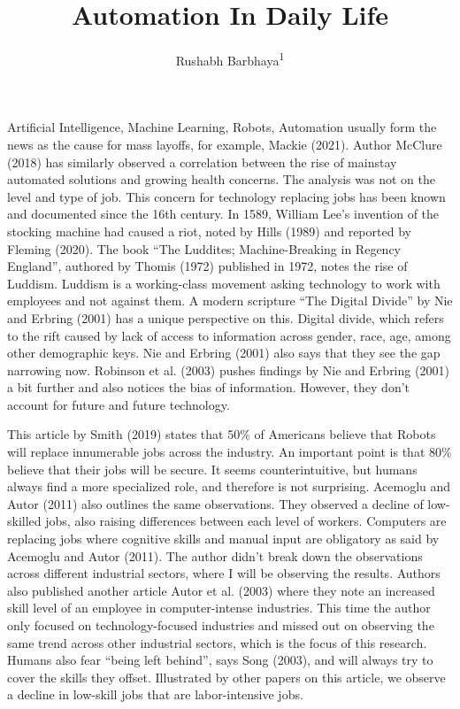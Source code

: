 \documentclass[
  man]{apa7}
\title{Automation In Daily Life}
\author{Rushabh Barbhaya\textsuperscript{1}}
\date{}
\affiliation{\vspace{0.5cm}\textsuperscript{1} Harrisburg University of Science and Technology}
\begin{document}
\maketitle

Artificial Intelligence, Machine Learning, Robots, Automation usually form the news as the cause for mass layoffs, for example, Mackie (2021). Author McClure (2018) has similarly observed a correlation between the rise of mainstay automated solutions and growing health concerns. The analysis was not on the level and type of job. This concern for technology replacing jobs has been known and documented since the 16th century. In 1589, William Lee's invention of the stocking machine had caused a riot, noted by Hills (1989) and reported by Fleming (2020). The book ``The Luddites; Machine-Breaking in Regency England'', authored by Thomis (1972) published in 1972, notes the rise of Luddism. Luddism is a working-class movement asking technology to work with employees and not against them. A modern scripture ``The Digital Divide'' by Nie and Erbring (2001) has a unique perspective on this. Digital divide, which refers to the rift caused by lack of access to information across gender, race, age, among other demographic keys. Nie and Erbring (2001) also says that they see the gap narrowing now. Robinson et al. (2003) pushes findings by Nie and Erbring (2001) a bit further and also notices the bias of information. However, they don't account for future and future technology.

This article by Smith (2019) states that 50\% of Americans believe that Robots will replace innumerable jobs across the industry. An important point is that 80\% believe that their jobs will be secure. It seems counterintuitive, but humans always find a more specialized role, and therefore is not surprising. Acemoglu and Autor (2011) also outlines the same observations. They observed a decline of low-skilled jobs, also raising differences between each level of workers. Computers are replacing jobs where cognitive skills and manual input are obligatory as said by Acemoglu and Autor (2011). The author didn't break down the observations across different industrial sectors, where I will be observing the results. Authors also published another article Autor et al. (2003) where they note an increased skill level of an employee in computer-intense industries. This time the author only focused on technology-focused industries and missed out on observing the same trend across other industrial sectors, which is the focus of this research. Humans also fear ``being left behind'', says Song (2003), and will always try to cover the skills they offset. Illustrated by other papers on this article, we observe a decline in low-skill jobs that are labor-intensive jobs.
\end{document}
